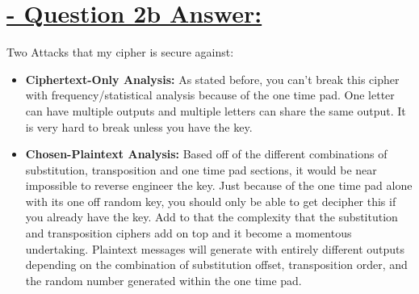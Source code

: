 \documentclass{article}
\begin{document}
\section{\underline{ - Question 2b Answer: }}
Two Attacks that my cipher is secure against:
\begin{itemize}
	\item \textbf{Ciphertext-Only Analysis: }As stated before, you can't break this cipher with frequency/statistical analysis because of the one time pad. One letter can have multiple outputs and multiple letters can share the same output. It is very hard to break unless you have the key.
	\item \textbf{Chosen-Plaintext Analysis: }Based off of the different combinations of substitution, transposition and one time pad sections, it would be near impossible to reverse engineer the key. Just because of the one time pad alone with its one off random key, you should only be able to get decipher this if you already have the key. Add to that the complexity that the substitution and transposition ciphers add on top and it become a momentous undertaking. Plaintext messages will generate with entirely different outputs depending on the combination of substitution offset, transposition order, and the random number generated within the one time pad.
	
\end{itemize}
\end{document}
